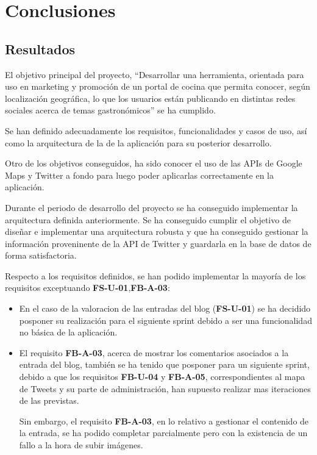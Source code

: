 \chapter{Conclusiones}

\section{Resultados}

El objetivo principal del proyecto, ``Desarrollar una herramienta, orientada para uso en marketing y promoción de un portal de cocina que permita conocer, según localización geográfica, lo que los usuarios están publicando en distintas redes sociales acerca de temas gastronómicos'' se ha cumplido.

Se han definido adecuadamente los requisitos, funcionalidades y casos de uso, así como la arquitectura de la de la aplicación para su posterior desarrollo.

Otro de los objetivos conseguidos, ha sido conocer el uso de las APIs de Google Maps y Twitter a fondo para luego poder aplicarlas correctamente en la aplicación.

Durante el periodo de desarrollo del proyecto se ha conseguido implementar la arquitectura definida anteriormente. Se ha conseguido cumplir el objetivo de diseñar e implementar una arquitectura robusta y que ha conseguido gestionar la información proveninente de la API de Twitter y guardarla en la base de datos de forma satisfactoria.

Respecto a los requisitos definidos, se han podido implementar la mayoría de los requisitos exceptuando \textbf{FS-U-01},\textbf{FB-A-03}: 

\begin{itemize}
\item En el caso de la valoracion de las entradas del blog (\textbf{FS-U-01}) se ha decidido posponer su realización para el siguiente sprint debido a ser una funcionalidad no básica de la aplicación. 

\item El requisito \textbf{FB-A-03}, acerca de mostrar los comentarios asociados a la entrada del blog, también se ha tenido que posponer para un siguiente sprint, debido a que los requisitos \textbf{FB-U-04} y \textbf{FB-A-05}, correspondientes
al mapa de Tweets y su parte de administración, han supuesto realizar mas iteraciones de las previstas. 

Sin embargo, el requisito \textbf{FB-A-03}, en lo relativo a gestionar el contenido de la entrada, se ha podido completar parcialmente pero con la existencia de un fallo a la hora de subir imágenes.

\end{itemize}


